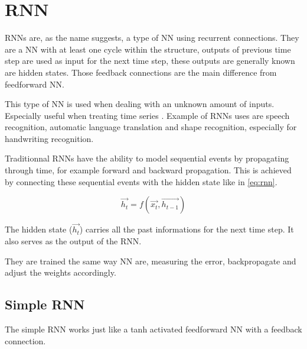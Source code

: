\section{\acs{RNN}}\label{sec:rnn}

\acp{RNN} are, as the name suggests, a type of \ac{NN} using recurrent connections. They are a \ac{NN} with at least one cycle within the structure, outputs of previous time step are used as input for the next time step, these outputs are generally known are hidden states. Those feedback connections are the main difference from feedforward \ac{NN}.

This type of \ac{NN} is used when dealing with an unknown amount of inputs. Especially useful when treating time series \cite{rnn}. Example of \acp{RNN} uses are speech recognition, automatic language translation \cite{gru} and shape recognition, especially for handwriting recognition.

Traditionnal \acp{RNN} have the ability to model sequential events by propagating through time, for example forward and backward propagation. This is achieved by connecting these sequential events with the hidden state like in \cref{eq:rnn}.

\begin{equation}\label{eq:rnn}
  \overrightarrow{h_t}=f(\overrightarrow{x_t},\overrightarrow{h_{t-1}})
\end{equation}

The hidden state ($\overrightarrow{h_t}$) carries all the past informations for the next time step. It also serves as the output of the \ac{RNN}.

They are trained the same way \ac{NN} are, measuring the error, backpropagate and adjust the weights accordingly.

\subsection{Simple \ac{RNN}}

The simple \ac{RNN} works just like a \ac{tanh} activated feedforward \ac{NN} with a feedback connection.

\begin{figure}[H]
  \centering
  \begin{minipage}{\columnwidth}
  \end{minipage}
  \begin{minipage}{\columnwidth}
  \end{minipage}
  \caption{}
\end{figure}

